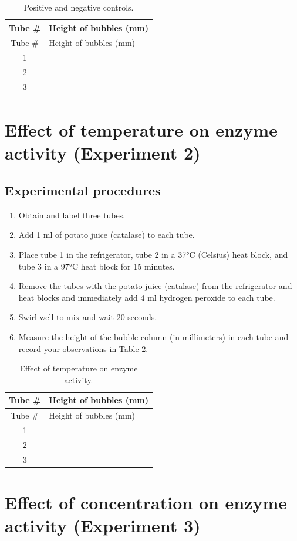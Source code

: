 \begin{longtable}[]{@{}cl@{}}
\caption{\label{tab:control} Positive and negative controls.}\tabularnewline
\toprule
Tube \# & Height of bubbles (mm)\tabularnewline
\midrule
\endfirsthead
\toprule
Tube \# & Height of bubbles (mm)\tabularnewline
\midrule
\endhead
1 &\tabularnewline
2 &\tabularnewline
3 &\tabularnewline
\bottomrule
\end{longtable}

\section{Effect of temperature on enzyme activity (Experiment
2)}\label{effect-of-temperature-on-enzyme-activity-experiment-2}

\subsection{Experimental procedures}\label{experimental-procedures-18}

\begin{enumerate}
\def\labelenumi{\arabic{enumi}.}
\tightlist
\item
  Obtain and label three tubes.
\item
  Add 1 ml of potato juice (catalase) to each tube.
\item
  Place tube 1 in the refrigerator, tube 2 in a 37°C (Celsius) heat
  block, and tube 3 in a 97°C heat block for 15 minutes.
\item
  Remove the tubes with the potato juice (catalase) from the
  refrigerator and heat blocks and immediately add 4 ml hydrogen
  peroxide to each tube.
\item
  Swirl well to mix and wait 20 seconds.
\item
  Measure the height of the bubble column (in millimeters) in each tube
  and record your observations in Table \ref{tab:temp}.
\end{enumerate}

\begin{longtable}[]{@{}cl@{}}
\caption{\label{tab:temp} Effect of temperature on enzyme
activity.}\tabularnewline
\toprule
Tube \# & Height of bubbles (mm)\tabularnewline
\midrule
\endfirsthead
\toprule
Tube \# & Height of bubbles (mm)\tabularnewline
\midrule
\endhead
1 &\tabularnewline
2 &\tabularnewline
3 &\tabularnewline
\bottomrule
\end{longtable}

\section{Effect of concentration on enzyme activity (Experiment
3)}\label{effect-of-concentration-on-enzyme-activity-experiment-3}


